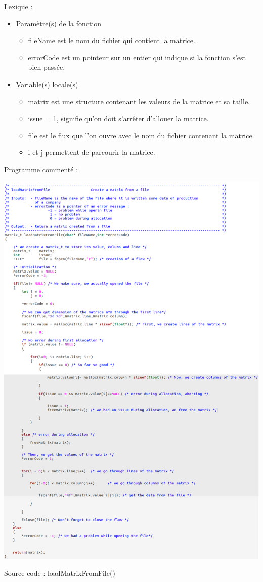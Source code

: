 \documentclass[a4paper]{article}
\begin{document}
\underline{Lexique :}
\begin{itemize}
\item Paramètre(s) de la fonction  
\begin{itemize}
\item fileName est le nom du fichier qui contient la matrice.
\item errorCode est un pointeur sur un entier qui indique si la fonction s'est bien passée.
\end{itemize}
\item Variable(s) locale(s)
\begin{itemize}
\item matrix est une structure contenant les valeurs de la matrice et sa taille.
\item issue = 1, signifie qu'on doit s'arrêter d'allouer la matrice.
\item file est le flux que l'on ouvre avec le nom du fichier contenant la matrice
\item i et j permettent de parcourir la matrice.
\end{itemize}
\end{itemize}

\underline{Programme commenté :}
\begin{center}
\includegraphics[scale=0.39]{loadMatrixFromFile.png}

Source code : loadMatrixFromFile()
\end{center}
\end{document}
